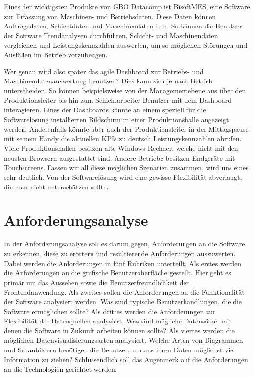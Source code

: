 Eines der wichtigsten Produkte von GBO Datacomp ist BisoftMES, eine Software zur Erfassung von
Maschinen- und Betriebsdaten. Diese Daten können Auftragsdaten, Schichtdaten und Maschinendaten sein.
So können die Benutzer der Software Trendanalysen durchführen, Schicht- und Maschinendaten vergleichen und
Leistungskennzahlen auswerten, um so möglichen Störungen und Ausfällen im Betrieb vorzubeugen.

Wer genau wird also später das agile Dashboard zur Betriebs- und Maschinendatenauswertung
benutzen? Dies kann sich je nach Betrieb unterscheiden. So können beispielsweise von der
Managementebene aus über den Produktionsleiter bis hin zum Schichtarbeiter Benutzer mit dem
Dashboard interagieren. Eines der Dashboards könnte an einem speziell für die Softwarelösung
installierten Bildschirm in einer Produktionshalle angezeigt werden. Anderenfalls könnte aber
auch der Produktionsleiter in der Mittagspause mit seinem Handy die aktuellen KPIs zu deutsch
Leistungskennzahlen abrufen. Viele Produktionshallen besitzen alte Windows-Rechner, welche nicht
mit den neusten Browsern ausgestattet sind. Andere Betriebe besitzen Endgeräte mit Touchscreens.
Fassen wir all diese möglichen Szenarien zusammen, wird uns eines sehr deutlich. Von der
Softwarelösung wird eine gewisse Flexibilität abverlangt, die man nicht unterschätzen sollte.


\section{Anforderungsanalyse}
In der Anforderungsanalyse soll es darum gegen, Anforderungen an die Software zu erkennen,
diese zu erörtern und resultierende Anforderungen auszuwerten. Dabei werden die Anforderungen
in fünf Rubriken unterteilt. Als erstes werden die Anforderungen an die grafische
Benutzeroberfläche gestellt. Hier geht es primär um das Aussehen sowie die Benutzerfreundlichkeit
der Frontendanwendung. Als zweites sollen die Anforderungen an die Funktionalität der
Software analysiert werden. Was sind typische Benutzerhandlungen, die die Software ermöglichen
sollte? Als drittes werden die Anforderungen zur Flexibilität der Datenquellen analysiert. Was
sind mögliche Datensätze, mit denen die Software in Zukunft arbeiten können sollte? Als viertes
werden die möglichen Datenvisualisierungsarten analysiert. Welche Arten von Diagrammen und
Schaubildern benötigen die Benutzer, um aus ihren Daten möglichst viel Information zu ziehen?
Schlussendlich soll das Augenmerk auf die Anforderungen an die Technologien gerichtet werden.

